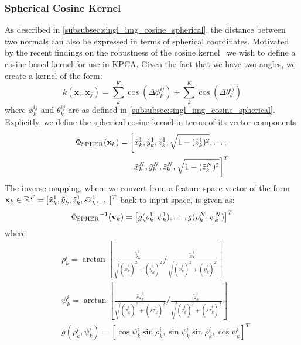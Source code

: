 \subsubsection{Spherical Cosine Kernel}\label{subsubsec:singl_img_cosine_kernel}
As described in \cref{subsubsec:singl_img_cosine_spherical}, the distance between
two normals can also be expressed in terms of spherical coordinates. Motivated
by the recent findings on the robustness of the cosine 
kernel~\cite{tzimiropoulos2012subspace,tzimiropoulos2010robust} 
we wish to define a cosine-based kernel for use in KPCA. Given the
fact that we have two angles, we create a kernel of the form:
\begin{equation}\label{eq:spher-cosine-kernel}
    k(\mathbf{x}_i, \mathbf{x}_j) = \sum^K_k \cos(\Delta \phi^{ij}_k) + \sum^K_k \cos(\Delta \theta^{ij}_k)
\end{equation}
where $\phi^{ij}_k$ and $\theta^{ij}_k$ are as defined in 
\cref{subsubsec:singl_img_cosine_spherical}. Explicitly, we define the spherical 
cosine kernel in terms of its vector components
\begin{equation}
    \begin{aligned}\label{eq:spher-kernel}
        \Phi_{\operatorname{SPHER}} (\boldsymbol{\mathbf{x}}_k) = \left[
                    \tilde{x}_k^1, \tilde{y}_k^1, \tilde{z}_k^1, \sqrt{1 - (\tilde{z}_k^1)^2}, \ldots, \right. \\
                    \left. \tilde{x}_k^N, \tilde{y}_k^N, \tilde{z}_k^N, \sqrt{1 - (\tilde{z}_k^N)^2}
                \right]^T
    \end{aligned}
\end{equation}
The inverse mapping, where we convert from a feature space vector of the form
$\mathbf{x}_k \in \mathbb{R}^F = [\tilde{x}_k^1, \tilde{y}_k^1, \tilde{z}_k^1,\tilde{sz}_k^1, \ldots]^T$ 
back to input space, is given as:
\begin{equation}\label{eq:inv-spher-kernel}
    {\Phi_{\operatorname{SPHER}}}^{-1} (\boldsymbol{\mathbf{v}}_k) = \left[ g (\rho_k^1, \psi_k^1), \ldots, g (\rho_k^N, \psi_k^N) \right]^T
\end{equation}
where 
\begin{equation}
    \begin{aligned}\label{eq:inv-spher-g}
        &\rho_k^i = \arctan [ \frac{\tilde{y}_k^i}{\sqrt{(\tilde{x}_k^i)^2 + (\tilde{y}_k^i)^2}} / \frac{\tilde{x}_k^i}{\sqrt{(\tilde{x}_k^i)^2 + (\tilde{y}_k^i)^2}} ] \\
        &\psi_k^i = \arctan [ \frac{\tilde{sz}_k^i}{\sqrt{(\tilde{z}_k^i)^2 + (\tilde{sz}_k^i)^2}} / \frac{\tilde{z}_k^i}{\sqrt{(\tilde{z}_k^i)^2 + (\tilde{sz}_k^i)^2}} ] \\
        &g(\rho_k^i, \psi_k^i) = [\cos \psi_k^i \sin \rho_k^i, \sin \psi_k^i \sin \rho_k^i, \cos \psi_k^i]^T
    \end{aligned}
\end{equation}
